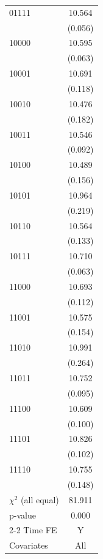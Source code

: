 \begin{tabular}{l c}
01111               &      10.564\sym{***}\\
                    &     (0.056)         \\
10000               &      10.595\sym{***}\\
                    &     (0.063)         \\
10001               &      10.691\sym{***}\\
                    &     (0.118)         \\
10010               &      10.476\sym{***}\\
                    &     (0.182)         \\
10011               &      10.546\sym{***}\\
                    &     (0.092)         \\
10100               &      10.489\sym{***}\\
                    &     (0.156)         \\
10101               &      10.964\sym{***}\\
                    &     (0.219)         \\
10110               &      10.564\sym{***}\\
                    &     (0.133)         \\
10111               &      10.710\sym{***}\\
                    &     (0.063)         \\
11000               &      10.693\sym{***}\\
                    &     (0.112)         \\
11001               &      10.575\sym{***}\\
                    &     (0.154)         \\
11010               &      10.991\sym{***}\\
                    &     (0.264)         \\
11011               &      10.752\sym{***}\\
                    &     (0.095)         \\
11100               &      10.609\sym{***}\\
                    &     (0.100)         \\
11101               &      10.826\sym{***}\\
                    &     (0.102)         \\
11110               &      10.755\sym{***}\\
                    &     (0.148)         \\
\addlinespace
$\chi^2$ (all equal)&      81.911         \\
p-value             &       0.000         \\
\cmidrule{2-2} Time FE & Y \\ Covariates & All \\ \bottomrule \end{tabular}
